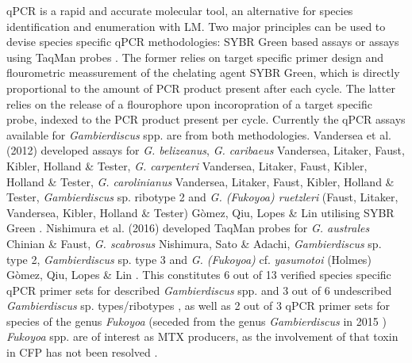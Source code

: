 \documentclass[12pt]{article}
\begin{document}
qPCR is a rapid and accurate molecular tool, an alternative for species identification and enumeration with LM. Two major principles can be used to devise species specific qPCR methodologies: SYBR Green based assays or assays using TaqMan probes \citep{smith2009advantages}. The former relies on target specific primer design and flourometric meassurement of the chelating agent SYBR Green, which is directly proportional to the amount of PCR product present after each cycle. The latter relies on the release of a flourophore upon incoropration of a target specific probe, indexed to the PCR product present per cycle. Currently the qPCR assays available for \emph{Gambierdiscus} spp. are from both methodologies. Vandersea et al. (2012) developed assays for \emph{G. belizeanus}, \emph{G. caribaeus} Vandersea, Litaker, Faust, Kibler, Holland \& Tester, \emph{G. carpenteri} Vandersea, Litaker, Faust, Kibler, Holland \& Tester, \emph{G. carolinianus} Vandersea, Litaker, Faust, Kibler, Holland \& Tester, \emph{Gambierdiscus} sp. ribotype 2 and \emph{G. (Fukoyoa) ruetzleri} (Faust, Litaker, Vandersea, Kibler, Holland \& Tester) G\`omez, Qiu, Lopes \& Lin utilising SYBR Green \citep{vandersea2012development}. Nishimura et al. (2016) developed TaqMan probes for \emph{G. australes} Chinian \& Faust, \emph{G. scabrosus} Nishimura, Sato \& Adachi, \emph{Gambierdiscus} sp. type 2, \emph{Gambierdiscus} sp. type 3 and \emph{G. (Fukoyoa)} cf. \emph{yasumotoi} (Holmes) G\`omez, Qiu, Lopes \& Lin \citep{nishimura2016quantitative}. This constitutes 6 out of 13 verified species specific qPCR primer sets for described \emph{Gambierdiscus} spp. and 3 out of 6 undescribed \emph{Gambierdiscus} sp. types/ribotypes , as well as 2 out of 3 qPCR primer sets for species of the genus \emph{Fukoyoa} (seceded from the genus \emph{Gambierdiscus} in 2015 \citep{gomez2015fukuyoa}) \textit{Fukoyoa} spp. are of interest as MTX producers, as the involvement of that toxin in CFP has not been resolved \citep{kohli2014feeding}. \\
\end{document}
